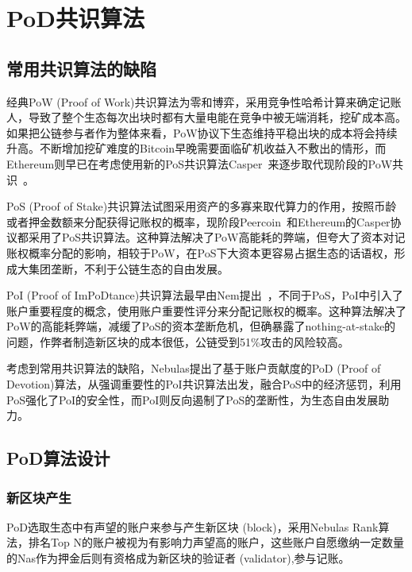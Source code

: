 \section{PoD共识算法}
\label{sec:PoD}

\subsection{常用共识算法的缺陷}
\label{PoD:weakness}

经典PoW (Proof of Work)共识算法为零和博弈，采用竞争性哈希计算来确定记账人，导致了整个生态每次出块时都有大量电能在竞争中被无端消耗，挖矿成本高。如果把公链参与者作为整体来看，PoW协议下生态维持平稳出块的成本将会持续升高。不断增加挖矿难度的Bitcoin早晚需要面临矿机收益入不敷出的情形，而Ethereum则早已在考虑使用新的PoS共识算法Casper~\cite{casper}来逐步取代现阶段的PoW共识~\cite{buterin2013ethereum}。

PoS (Proof of Stake)共识算法试图采用资产的多寡来取代算力的作用，按照币龄或者押金数额来分配获得记账权的概率，现阶段Peercoin~\cite{king2012peercoin}和Ethereum的Casper协议都采用了PoS共识算法。这种算法解决了PoW高能耗的弊端，但夸大了资本对记账权概率分配的影响，相较于PoW，在PoS下大资本更容易占据生态的话语权，形成大集团垄断，不利于公链生态的自由发展。

PoI (Proof of ImPoDtance)共识算法最早由Nem提出~\cite{nem}，不同于PoS，PoI中引入了账户重要程度的概念，使用账户重要性评分来分配记账权的概率。这种算法解决了PoW的高能耗弊端，减缓了PoS的资本垄断危机，但确暴露了nothing-at-stake的问题，作弊者制造新区块的成本很低，公链受到51\%攻击的风险较高。

考虑到常用共识算法的缺陷，Nebulas提出了基于账户贡献度的PoD (Proof of Devotion)算法，从强调重要性的PoI共识算法出发，融合PoS中的经济惩罚，利用PoS强化了PoI的安全性，而PoI则反向遏制了PoS的垄断性，为生态自由发展助力。

\subsection{PoD算法设计}
\label{PoD:design}

\subsubsection{新区块产生}
\label{PoD:design:block}

PoD选取生态中有声望的账户来参与产生新区块 (block)，采用Nebulas Rank算法，排名Top N的账户被视为有影响力声望高的账户，这些账户自愿缴纳一定数量的Nas作为押金后则有资格成为新区块的验证者 (validator),参与记账。

